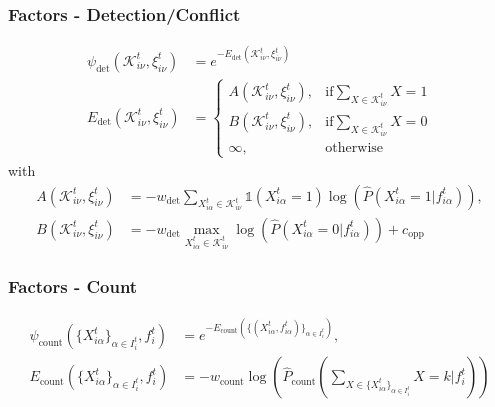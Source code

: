\begin{frame}[plain]
    \frametitle{Factors - Detection/Conflict}
    \begin{align*}
        \psi_{\text{det}}(\mathcal{K}_{i\nu}^t, \xi_{i\nu}^t) &=
        e^{-E_{\text{det}}(\mathcal{K}_{i\nu}^t, \xi_{i\nu}^t)} \\
        E_{\text{det}}(\mathcal{K}_{i\nu}^t, \xi_{i\nu}^t)&=
        \begin{cases}
            A(\mathcal{K}_{i\nu}^t, \xi_{i\nu}^t), &\text{if} \sum_{X \in \mathcal{K}_{i\nu}^t} X = 1 \\ 
            B(\mathcal{K}_{i\nu}^t, \xi_{i\nu}^t), &\text{if} \sum_{X \in \mathcal{K}_{i\nu}^t} X = 0 \\ 
            \infty, &\text{otherwise}
        \end{cases}
    \end{align*}
    with
    \begin{align*}
        A(\mathcal{K}_{i\nu}^t, \xi_{i\nu}^t) &=-w_{\text{det}} \sum_{X_{i\alpha}^t \in \mathcal{K}_{i\nu}^t}
        \mathds{1} \left(X_{i\alpha}^t =
            1\right)\log\left(\hat{P}(X_{i\alpha}^t=1|f_{i\alpha}^t)\right),
        \\
        B(\mathcal{K}_{i\nu}^t, \xi_{i\nu}^t) &= -w_{\text{det}} \max_{X_{i\alpha}^t\in\mathcal{K}_{i\nu}^t}
        \log\left(\hat{P}(X_{i\alpha}^t = 0|f_{i\alpha}^t)\right) + c_{\text{opp}}
    \end{align*}
\end{frame}


\begin{frame}[plain]
    \frametitle{Factors - Count}
    \begin{align*}
        \psi_{\text{count}}(\{X_{i\alpha}^t\}_{\alpha \in
            I_i^t},f_{i}^t)&=e^{-E_{\text{count}}(\{(X_{i\alpha}^t,f_{i\alpha}^t)\}_{\alpha \in I_i^t})}, \\
        E_{\text{count}}(\{X_{i\alpha}^t\}_{\alpha \in I_i^t},f_{i}^t) &=
        -w_{\text{count}}\log\left(\hat{P}_{\text{count}}\left(\sum_{X \in \{X_{i\alpha}^t\}_{\alpha \in
                        I_i^t}}X=k|f_i^t\right)\right)
    \end{align*}
\end{frame}


